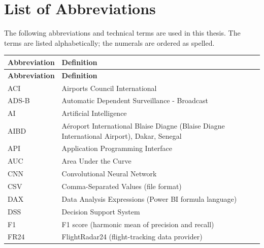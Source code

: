 \chapter*{List of Abbreviations}

The following abbreviations and technical terms are used in this thesis.
The terms are listed alphabetically; the numerals are ordered as spelled.

\vspace{0.5cm}

\renewcommand{\arraystretch}{1.15}

\begin{longtable}{@{}p{}p{}@{}}

\toprule
\textbf{Abbreviation} & \textbf{Definition} \\
\midrule
\endfirsthead

\toprule
\textbf{Abbreviation} & \textbf{Definition} \\
\midrule
\endhead

ACI &
Airports Council International \\

ADS-B &
Automatic Dependent Surveillance - Broadcast \\

AI &
Artificial Intelligence \\

AIBD &
Aéroport International Blaise Diagne
(Blaise Diagne International Airport), Dakar, Senegal \\

API &
Application Programming Interface \\

AUC &
Area Under the Curve \\

CNN &
Convolutional Neural Network \\

CSV &
Comma-Separated Values (file format) \\

DAX &
Data Analysis Expressions (Power BI formula language) \\

DSS &
Decision Support System \\

F1 &
F1 score (harmonic mean of precision and recall) \\

FR24 &
FlightRadar24 (flight-tracking data provider) \\


\end{longtable}
